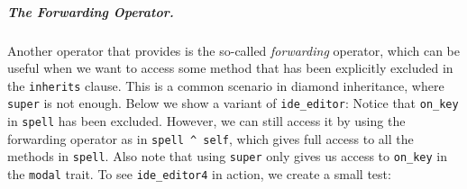 



\subparagraph{The Forwarding Operator.}
Another operator that \name provides is the so-called \emph{forwarding}
operator, which can be useful when we want to access some method that has been
explicitly excluded in the \lstinline{inherits} clause. This is a common scenario in
diamond inheritance, where \lstinline{super} is not enough. Below we show a
variant of \lstinline{ide_editor}:
Notice that \lstinline{on_key} in \lstinline{spell} has been
excluded. However, we can
still access it by using the forwarding operator as in \lstinline{spell ^ self},
which gives full access to all the methods in \lstinline{spell}. Also note that
using \lstinline{super} only gives us access to \lstinline{on_key} in the
\lstinline{modal} trait. To see \lstinline{ide_editor4} in action, we create a
small test:

